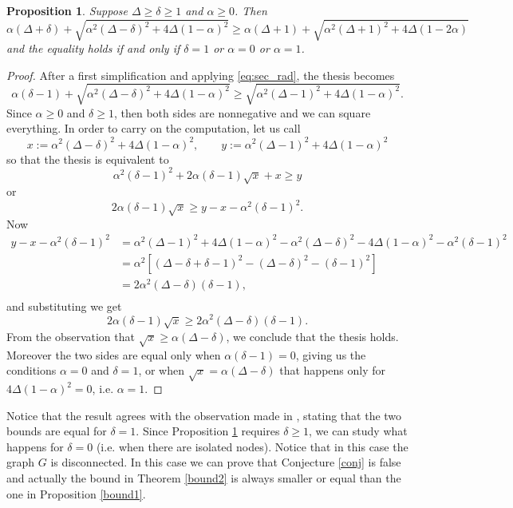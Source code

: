 \documentclass[a4paper,10pt]{article}
\theoremstyle{definition}
\theoremstyle{plain}
\newtheorem{proposition}{Proposition}
\begin{document}
\begin{proposition}
\label{prop1}    Suppose $\Delta \ge \delta \ge 1$ and $\alpha\ge 0$. Then 
        \[
    \alpha(\Delta + \delta) +\sqrt{\alpha^2(\Delta-\delta)^2 + 4\Delta(1-\alpha)^2}
    \ge 
     \alpha(\Delta + 1) +\sqrt{\alpha^2(\Delta+1)^2 + 4\Delta(1-2\alpha)}
    \]
    and the equality holds if and only if $\delta = 1$ or $\alpha = 0$ or $\alpha = 1$. 
\end{proposition}
\begin{proof}
    After a first simplification and applying \eqref{eq:sec_rad}, the thesis becomes
            \[
    \alpha(\delta-1) +\sqrt{\alpha^2(\Delta-\delta)^2 + 4\Delta(1-\alpha)^2}
    \ge 
    \sqrt{\alpha^2(\Delta-1)^2 + 4\Delta(1-\alpha)^2}.
    \]
    Since $\alpha\ge 0$ and $\delta\ge 1$, then  both sides are nonnegative and we can square everything. In order to carry on the computation, let us call
    \[
    x :=\alpha^2(\Delta-\delta)^2 + 4\Delta(1-\alpha)^2, \qquad y:= \alpha^2(\Delta-1)^2 + 4\Delta(1-\alpha)^2
    \]
    so that the thesis is equivalent to 
    \[
    \alpha^2(\delta-1)^2 + 2\alpha(\delta-1)\sqrt x + x \ge y
    \]
    or  
    \[
       2\alpha(\delta-1)\sqrt x  \ge y - x -  \alpha^2(\delta-1)^2.
    \]
    Now 
 \begin{align*}
      y - x -  \alpha^2(\delta-1)^2 &= 
      \alpha^2(\Delta-1)^2 + 4\Delta(1-\alpha)^2 - \alpha^2(\Delta-\delta)^2 - 4\Delta(1-\alpha)^2 - \alpha^2(\delta-1)^2\\
      &= \alpha^2\left[ 
      (\Delta-\delta + \delta - 1)^2  - (\Delta-\delta)^2 -(\delta-1)^2
      \right]\\
      &= 2\alpha^2(\Delta-\delta)(\delta-1),\\
 \end{align*} 
 and substituting we get
 \[
  2\alpha(\delta-1)\sqrt x  \ge 2\alpha^2(\Delta-\delta)(\delta-1).
 \]
 From the observation that  $\sqrt x \ge \alpha(\Delta-\delta)$, we conclude that the thesis holds. Moreover the two sides are equal only when $\alpha(\delta-1) =0$, giving us the conditions $\alpha=0$ and $\delta=1$, or when $\sqrt x = \alpha(\Delta-\delta)$ that happens only for $4\Delta(1-\alpha)^2 = 0$, i.e. $\alpha = 1$. 
\end{proof}

Notice that the result agrees with the observation made in \cite{1}, stating that  the two bounds are equal for $\delta=1$. 
Since Proposition \ref{prop1} requires $\delta\ge 1$, we can study what happens for $\delta = 0$ (i.e. when there are isolated nodes). Notice that in this case the graph $G$ is disconnected. In this case we can prove that Conjecture \ref{conj}
 is false and actually  the bound in Theorem \ref{bound2}  is always smaller or equal than the one in Proposition \ref{bound1}.
 
\end{document}
